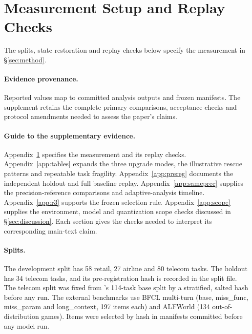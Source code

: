 \section{Measurement Setup and Replay Checks}
\label{app:setup}

The splits, state restoration and replay checks below specify the measurement in \S\ref{sec:method}.
\paragraph{Evidence provenance.}\label{app:figsrc} Reported values map to committed analysis outputs and frozen manifests. The supplement retains the complete primary comparisons, acceptance checks and protocol amendments needed to assess the paper's claims.

\paragraph{Guide to the supplementary evidence.} Appendix~\ref{app:setup} specifies the measurement and its replay checks. Appendix~\ref{app:tables} expands the three upgrade modes, the illustrative rescue patterns and repeatable task fragility. Appendix~\ref{app:prereg} documents the independent holdout and full baseline replay. Appendix~\ref{app:sameprec} supplies the precision-reference comparisons and adaptive-analysis timeline. Appendix~\ref{app:r3} supports the frozen selection rule. Appendix~\ref{app:scope} supplies the environment, model and quantization scope checks discussed in \S\ref{sec:discussion}. Each section gives the checks needed to interpret its corresponding main-text claim.

\paragraph{Splits.} The development split has 58 retail, 27 airline and 80 telecom tasks. The holdout has 34 telecom tasks, and its pre-registration hash is recorded in the split file. %
The telecom split was fixed from \tautwo{}'s 114-task base split by a stratified, salted hash before any run. %
The external benchmarks use BFCL multi-turn (base, miss\_func, miss\_param and long\_context, 197 items each) and ALFWorld (134 out-of-distribution games). Items were selected by hash in manifests committed before any model run. %

